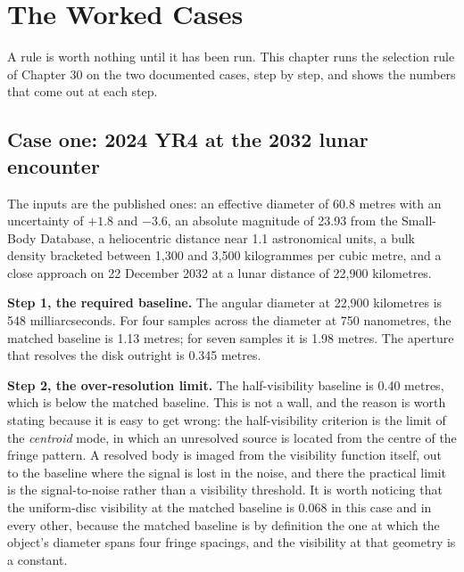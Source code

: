 
\chapter{The Worked Cases}
\label{ch:worked-cases}

A rule is worth nothing until it has been run. This chapter runs the
selection rule of Chapter 30 on the two documented cases, step by step, and
shows the numbers that come out at each step.

\section{Case one: 2024 YR4 at the 2032 lunar encounter}

The inputs are the published ones: an effective diameter of 60.8 metres with
an uncertainty of \(+1.8\) and \(-3.6\), an absolute magnitude of 23.93 from
the Small-Body Database, a heliocentric distance near 1.1 astronomical units,
a bulk density bracketed between 1,300 and 3,500 kilogrammes per cubic metre,
and a close approach on 22 December 2032 at a lunar distance of 22,900
kilometres.

\textbf{Step 1, the required baseline.} The angular diameter at 22,900
kilometres is 548 milliarcseconds. For four samples across the diameter at
750 nanometres, the matched baseline is 1.13 metres; for seven samples it is
1.98 metres. The aperture that resolves the disk outright is 0.345 metres.

\textbf{Step 2, the over-resolution limit.} The half-visibility baseline is
0.40 metres, which is below the matched baseline. This is not a wall, and
the reason is worth stating because it is easy to get wrong: the
half-visibility criterion is the limit of the \emph{centroid} mode, in which
an unresolved source is located from the centre of the fringe pattern. A
resolved body is imaged from the visibility function itself, out to the
baseline where the signal is lost in the noise, and there the practical limit
is the signal-to-noise rather than a visibility threshold. It is worth
noticing that the uniform-disc visibility at the matched baseline is 0.068
in this case and in every other, because the matched baseline is by
definition the one at which the object's diameter spans four fringe
spacings, and the visibility at that geometry is a constant.


